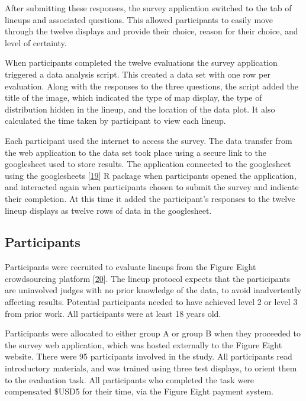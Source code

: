 \documentclass[conference,final,]{IEEEtran}
\begin{document}
After submitting these responses, the survey application switched to the tab of lineups and associated questions. This allowed participants to easily move through the twelve displays and provide their choice, reason for their choice, and level of certainty.

When participants completed the twelve evaluations the survey application triggered a data analysis script. This created a data set with one row per evaluation. Along with the responses to the three questions, the script added the title of the image, which indicated the type of map display, the type of distribution hidden in the lineup, and the location of the data plot. It also calculated the time taken by participant to view each lineup.

Each participant used the internet to access the survey.
The data transfer from the web application to the data set took place using a secure link to the googlesheet used to store results. The application connected to the googlesheet using the googlesheets {[}\protect\hyperlink{ref-sheets}{19}{]} R package when participants opened the application, and interacted again when participants chosen to submit the survey and indicate their completion. At this time it added the participant's responses to the twelve lineup displays as twelve rows of data in the googlesheet.

\hypertarget{participants}{%
\subsection{Participants}\label{participants}}

Participants were recruited to evaluate lineups from the Figure Eight crowdsourcing platform {[}\protect\hyperlink{ref-figeight}{20}{]}.
The lineup protocol expects that the participants are uninvolved judges with no prior knowledge of the data, to avoid inadvertently affecting results. Potential participants needed to have achieved level 2 or level 3 from prior work. All participants were at least 18 years old.

Participants were allocated to either group A or group B when they proceeded to the survey web application, which was hosted externally to the Figure Eight website. There were 95 participants involved in the study. All participants read introductory materials, and was trained using three test displays, to orient them to the evaluation task. All participants who completed the task were compensated \$USD5 for their time, via the Figure Eight payment system.
\end{document}
